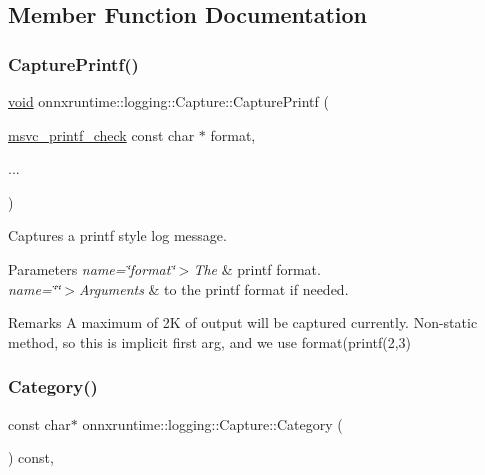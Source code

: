 \subsection{Member Function Documentation}
\mbox{\label{classonnxruntime_1_1logging_1_1Capture_a3b7d64d0e021d658c4d0950727b2612c}} 
\subsubsection{\texorpdfstring{Capture\+Printf()}{CapturePrintf()}}
{\footnotesize\ttfamily \mbox{\hyperlink{mlasi_8h_a88f941d423cb2a819b70a1358982b1a6}{void}} onnxruntime\+::logging\+::\+Capture\+::\+Capture\+Printf (\begin{DoxyParamCaption}\item[{\mbox{\hyperlink{capture_8h_a7249ae45e189a29f562633e536a1042c}{msvc\+\_\+printf\+\_\+check}} const char $\ast$}]{format,  }\item[{}]{... }\end{DoxyParamCaption})}

Captures a printf style log message. 
\begin{DoxyParams}{Parameters}
{\em name=\char`\"{}format\char`\"{}$>$\+The} & printf format. \\
\hline
{\em name=\char`\"{}\char`\"{}$>$\+Arguments} & to the printf format if needed. \\
\hline
\end{DoxyParams}
\begin{DoxyRemark}{Remarks}
A maximum of 2K of output will be captured currently. Non-\/static method, so \textquotesingle{}this\textquotesingle{} is implicit first arg, and we use format(printf(2,3) 
\end{DoxyRemark}
\mbox{\label{classonnxruntime_1_1logging_1_1Capture_adb3d6734a64050e6662760db493662ad}} 
\subsubsection{\texorpdfstring{Category()}{Category()}}
{\footnotesize\ttfamily const char$\ast$ onnxruntime\+::logging\+::\+Capture\+::\+Category (\begin{DoxyParamCaption}{ }\end{DoxyParamCaption}) const\hspace{0.3cm}{\ttfamily [inline]}, {\ttfamily [noexcept]}}

